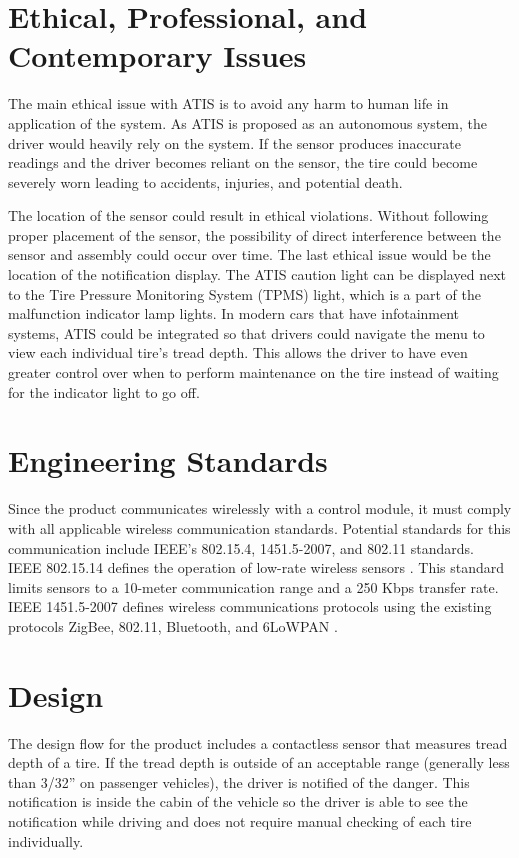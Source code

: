 \documentclass[11pt]{IEEEtran}
\begin{document}
	\section{Ethical, Professional, and Contemporary Issues}
		The main ethical issue with ATIS is to avoid any harm to human life in application of the system. As ATIS is proposed as an autonomous system, the driver would heavily rely on the system. If the sensor produces inaccurate readings and the driver becomes reliant on the sensor, the tire could become severely worn leading to accidents, injuries, and potential death. 

		The location of the sensor could result in ethical violations. Without following proper placement of the sensor, the possibility of direct interference between the sensor and assembly could occur over time. The last ethical issue would be the location of the notification display. The ATIS caution light can be displayed next to the Tire Pressure Monitoring System (TPMS) light, which is a part of the malfunction indicator lamp lights. In modern cars that have infotainment systems, ATIS could be integrated so that drivers could navigate the menu to view each individual tire's tread depth. This allows the driver to have even greater control over when to perform maintenance on the tire instead of waiting for the indicator light to go off.


	\section{Engineering Standards}
		Since the product communicates wirelessly with a control module, it must comply with all applicable wireless communication standards. Potential standards for this communication include IEEE’s 802.15.4, 1451.5-2007, and 802.11 standards. IEEE 802.15.14 defines the operation of low-rate wireless sensors \cite{80215standard}. This standard limits sensors to a 10-meter communication range and a 250 Kbps transfer rate. IEEE 1451.5-2007 defines wireless communications protocols using the existing protocols ZigBee, 802.11, Bluetooth, and 6LoWPAN \cite{1451standard}.

	\section{Design}
		\label{Design}
		The design flow for the product includes a contactless sensor that measures tread depth of a tire. If the tread depth is outside of an acceptable range (generally less than 3/32'' on passenger vehicles), the driver is notified of the danger. This notification is inside the cabin of the vehicle so the driver is able to see the notification while driving and does not require manual checking of each tire individually. 
\end{document}
